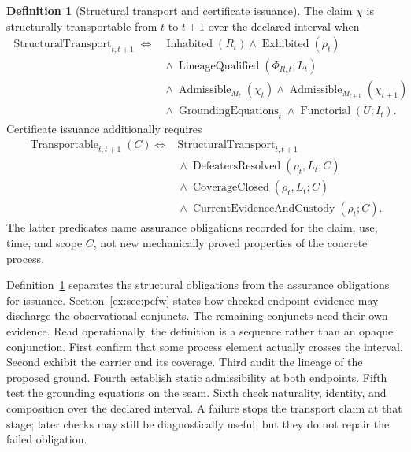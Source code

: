 \documentclass[11pt]{article}
\theoremstyle{definition}
\newtheorem{definition}{Definition}[section]
\begin{document}
\begin{definition}[Structural transport and certificate issuance]\label{ex:def:nonvacuous-transport}
The claim $\chi$ is structurally transportable from $t$ to $t+1$ over the declared interval when
\[
\begin{aligned}
\operatorname{StructuralTransport}_{t,t+1} \Longleftrightarrow{}&
\operatorname{Inhabited}(R_t) \land \operatorname{Exhibited}(\rho_t) \\
&{}\land \operatorname{LineageQualified}(\Phi_{R,t};L_t) \\
&{}\land \operatorname{Admissible}_{M_t}(\chi_t) \land \operatorname{Admissible}_{M_{t+1}}(\chi_{t+1}) \\
&{}\land \operatorname{GroundingEquations}_t \land \operatorname{Functorial}(U;I_t).
\end{aligned}
\]
Certificate issuance additionally requires
\[
\begin{aligned}
\operatorname{Transportable}_{t,t+1}(C)\Longleftrightarrow{}&
\operatorname{StructuralTransport}_{t,t+1}\\
&{}\land\operatorname{DefeatersResolved}(\rho_t,L_t;C)\\
&{}\land\operatorname{CoverageClosed}(\rho_t,L_t;C)\\
&{}\land\operatorname{CurrentEvidenceAndCustody}(\rho_t;C).
\end{aligned}
\]
The latter predicates name assurance obligations recorded for the claim, use, time, and scope $C$, not new mechanically proved properties of the concrete process.
\end{definition}

Definition~\ref{ex:def:nonvacuous-transport} separates the structural obligations from the assurance obligations for issuance. Section~\ref{ex:sec:pcfw} states how checked endpoint evidence may discharge the observational conjuncts. The remaining conjuncts need their own evidence. Read operationally, the definition is a sequence rather than an opaque conjunction. First confirm that some process element actually crosses the interval. Second exhibit the carrier and its coverage. Third audit the lineage of the proposed ground. Fourth establish static admissibility at both endpoints. Fifth test the grounding equations on the seam. Sixth check naturality, identity, and composition over the declared interval. A failure stops the transport claim at that stage; later checks may still be diagnostically useful, but they do not repair the failed obligation.
\end{document}

